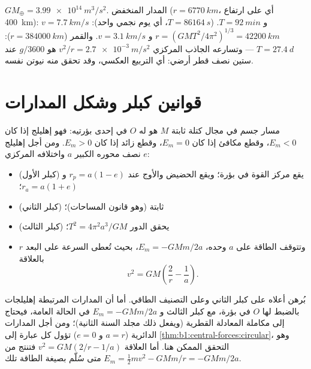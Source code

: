 \begin{example}\label{ex:b1:central-forces:orbits}
$GM_\oplus = \qty{3.99e14}{m^3/s^2}$. المدار المنخفض ($r = \qty{6770}{km}$،
أي على ارتفاع \qty{400}{km}): $v = \qty{7.7}{km/s}$ و $T = \qty{92}{min}$.  ($T = \qty{86164}{s}$، أي يوم نجمي واحد): $r = (GMT^2/4\pi^2)^{1/3} =
\qty{42200}{km}$ و $v = \qty{3.1}{km/s}$. والقمر ($r = \qty{384000}{km}$):
$T = \qty{27.4}{d}$ --- وتسارعه الجاذب المركزي $v^2/r =
\qty{2.7e-3}{m/s^2}$ هو $g/3600$ عند ستين نصف قطر أرضي: أي التربيع
العكسي، وقد تحقق منه نيوتن نفسه.
\end{example}

\section{قوانين كبلر وشكل المدارات}

\begin{theorem}\label{thm:b1:central-forces:conics}
مسار جسم في مجال كتلة ثابتة $M$ هو 
له $O$ في إحدى بؤرتيه: فهو إهليلج إذا كان $E_m < 0$، وقطع مكافئ إذا كان $E_m = 0$،
وقطع زائد إذا كان $E_m > 0$. ومن أجل إهليلج نصف محوره الكبير $a$
واختلافه المركزي $e$:
\begin{itemize}
  \item (كبلر الأول) يقع مركز القوة في بؤرة؛ ويقع الحضيض والأوج
        عند $r_p = a(1 - e)$ و $r_a = a(1 + e)$؛
  \item (كبلر الثاني)  ثابتة (وهو قانون المساحات)؛
  \item (كبلر الثالث) يحقق الدور $T^2 = 4\pi^2a^3/GM$؛
  \item وتتوقف الطاقة على $a$ وحده، $E_m = -GMm/2a$، بحيث تُعطى
        السرعة على البعد $r$ بالعلاقة
        \[
        v^2 = GM\left(\frac{2}{r} - \frac{1}{a}\right) .
        \]
\end{itemize}
\end{theorem}
\admitted

\begin{remark}\label{rem:b1:central-forces:admitted}
بُرهن أعلاه على كبلر الثاني وعلى التصنيف الطاقي. أما أن
المدارات المرتبطة إهليلجات بالضبط لها $O$ في بؤرة، مع كبلر الثالث
و $E_m = -GMm/2a$ في الحالة العامة، فيحتاج إلى مكاملة المعادلة
القطرية (ويفعل ذلك مجلد السنة الثانية)؛ ومن أجل المدارات الدائرية ($a = r$
و $e = 0$) تؤول كل عبارة إلى \cref{thm:b1:central-forces:circular}،
وهو التحقق الممكن هنا. أما العلاقة $v^2 = GM(2/r - 1/a)$
فتنتج من $E_m = \tfrac12 mv^2 - GMm/r = -GMm/2a$ متى سُلّم بصيغة
الطاقة تلك.
\end{remark}

